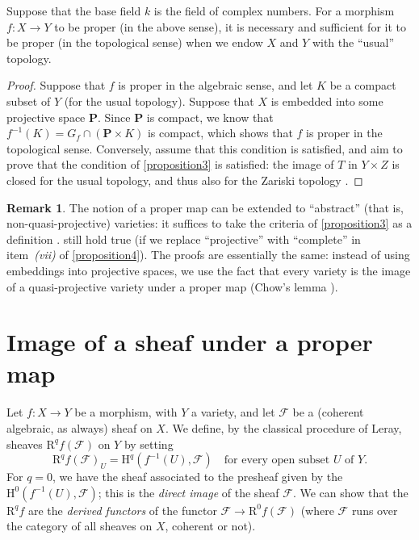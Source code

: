 \documentclass{article}
\theoremstyle{plain}
\newenvironment{proposition}[1]
    {\renewcommand\theinnercustomproposition{#1}\innercustomproposition}
    {\endinnercustomproposition}
\theoremstyle{definition}
\newtheorem*{remark}{Remark}
\newcommand{\sh}{\mathscr}
\newcommand{\HH}{\mathrm{H}}
\newcommand{\RR}{\mathrm{R}}
\newcommand{\PP}{\mathbf{P}}
\newcommand{\oldpage}[1]{\marginpar{\footnotesize$\Big\vert$ \textit{p.~#1}}}
\begin{document}
\begin{proposition}{5}
\label{proposition5}
  Suppose that the base field $k$ is the field of complex numbers.
  For a morphism $f\colon X\to Y$ to be proper (in the above sense), it is necessary and sufficient for it to be proper (in the topological sense) when we endow $X$ and $Y$ with the ``usual'' topology.
\end{proposition}

\begin{proof}
  Suppose that $f$ is proper in the algebraic sense, and let $K$ be a compact subset of $Y$ (for the usual topology).
  Suppose that $X$ is embedded into some projective space $\PP$.
  Since $\PP$ is compact, we know that $f^{-1}(K)=G_f\cap(\PP\times K)$ is compact, which shows that $f$ is proper in the topological sense.
  Conversely, assume that this condition is satisfied, and aim to prove that the condition of \cref{proposition3} is satisfied:
\oldpage{102}
  the image of $T$ in $Y\times Z$ is closed for the usual topology, and thus also for the Zariski topology \cite[proposition~7, p.~12]{13}.
\end{proof}

\begin{remark}
  The notion of a proper map can be extended to ``abstract'' (that is, non-quasi-projective) varieties:
  it suffices to take the criteria of \cref{proposition3} as a definition \cite{4}.
   still hold true (if we replace ``projective'' with ``complete'' in item~\emph{(vii)} of \cref{proposition4}).
  The proofs are essentially the same:
  instead of using embeddings into projective spaces, we use the fact that every variety is the image of a quasi-projective variety under a proper map (Chow's lemma \cite{4,14}).
\end{remark}


\section{Image of a sheaf under a proper map}
\label{section3}

Let $f\colon X\to Y$ be a morphism, with $Y$ a variety, and let $\sh{F}$ be a (coherent algebraic, as always) sheaf on $X$.
We define, by the classical procedure of Leray, sheaves $\RR^qf(\sh{F})$ on $Y$ by setting
\[
  \RR^qf(\sh{F})_U = \HH^q(f^{-1}(U),\sh{F})
  \quad\mbox{for every open subset $U$ of $Y$.}
\]
For $q=0$, we have the sheaf associated to the presheaf given by the $\HH^0(f^{-1}(U),\sh{F})$;
this is the \emph{direct image} of the sheaf $\sh{F}$.
We can show \cite{7} that the $\RR^qf$ are the \emph{derived functors} of the functor $\sh{F}\to\RR^0f(\sh{F})$ (where $\sh{F}$ runs over the category of all sheaves on $X$, coherent or not).
\end{document}
